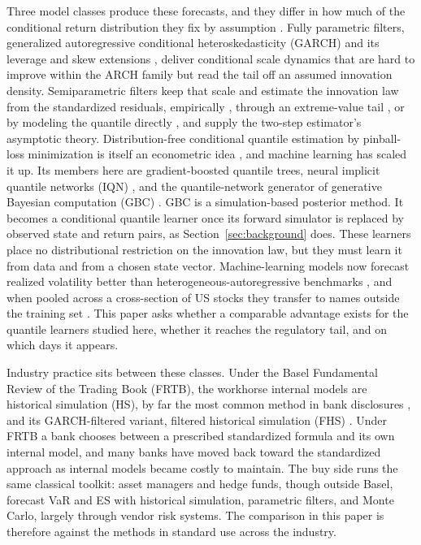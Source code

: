 \documentclass[11pt]{article}
\theoremstyle{remark}
\begin{document}
Three
model classes produce these forecasts, and they differ in how much of
the conditional return distribution they fix by assumption
\citep{kuester2006, nietoruiz2016}. Fully parametric filters, generalized autoregressive conditional heteroskedasticity (GARCH) and
its leverage and skew extensions \citep{bollerslev1986, glosten1993},
deliver conditional scale dynamics that are hard to improve within the
ARCH family \citep{hansenlunde2005} but read the tail off an assumed
innovation density. Semiparametric filters keep that scale and estimate
the innovation law from the standardized residuals, empirically
\citep{baroneadesi1999fhs}, through an extreme-value tail
\citep{mcneilfrey2000}, or by modeling the quantile directly
\citep{engle2004caviar}, and \citet{francqzakoian2015} supply the
two-step estimator's asymptotic theory. Distribution-free conditional
quantile estimation by pinball-loss minimization is itself an
econometric idea \citep{koenker1978}, and machine learning has scaled
it up. Its members here are gradient-boosted quantile trees, neural
implicit quantile networks (IQN) \citep{dabney2018iqn}, and the
quantile-network generator of generative Bayesian computation (GBC)
\citep{polson2023gbc}. GBC is a simulation-based posterior method. It
becomes a conditional quantile learner once its forward simulator is
replaced by observed state and return pairs, as
Section~\ref{sec:background} does. These learners place no distributional restriction on the
innovation law, but they must learn it from data and from a chosen
state vector. Machine-learning models now forecast realized volatility better than
heterogeneous-autoregressive benchmarks \citep{bucci2020,
christensen2023ml}, and when pooled across a cross-section of US stocks
they transfer to names outside the training set
\citep{zhang2024commonality}. This paper asks whether a comparable advantage exists for
the quantile learners studied here, whether it reaches the regulatory
tail, and on which days it appears.

Industry practice sits between these classes. Under the Basel Fundamental Review of the Trading Book (FRTB), the workhorse internal models are historical simulation (HS), by far the most common method in bank disclosures \citep{perignonsmith2010}, and its GARCH-filtered variant, filtered historical simulation (FHS) \citep{baroneadesi1999fhs}. Under FRTB a bank chooses between a prescribed standardized formula and its own internal model, and many banks have moved back toward the standardized approach as internal models became costly to maintain. The buy side runs the same classical toolkit: asset managers and hedge funds, though outside Basel, forecast VaR and ES with historical simulation, parametric filters, and Monte Carlo, largely through vendor risk systems. The comparison in this paper is therefore against the methods in standard use across the industry.
\end{document}
